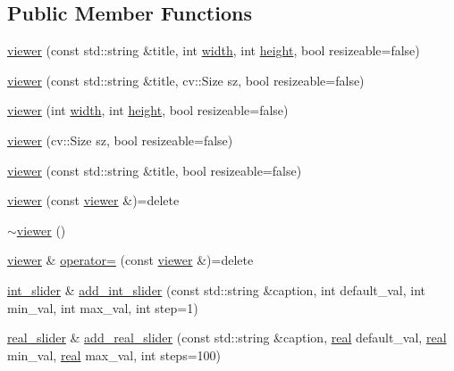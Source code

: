 \subsection*{Public Member Functions}
\begin{DoxyCompactItemize}
\item 
\hyperlink{classtlz_1_1viewer_ab840cedc6c257c4270c43d59705842cc}{viewer} (const std\+::string \&title, int \hyperlink{classtlz_1_1viewer_acc43bf1dd1d0c3cdc35a948d4c194769}{width}, int \hyperlink{classtlz_1_1viewer_af74a8aef9dde68eeff6b1e2561b39014}{height}, bool resizeable=false)
\item 
\hyperlink{classtlz_1_1viewer_a197747fd66bf0c2cb69ac598e08f6e79}{viewer} (const std\+::string \&title, cv\+::\+Size sz, bool resizeable=false)
\item 
\hyperlink{classtlz_1_1viewer_a3d7acc2df49af00c659dd55c6898344d}{viewer} (int \hyperlink{classtlz_1_1viewer_acc43bf1dd1d0c3cdc35a948d4c194769}{width}, int \hyperlink{classtlz_1_1viewer_af74a8aef9dde68eeff6b1e2561b39014}{height}, bool resizeable=false)
\item 
\hyperlink{classtlz_1_1viewer_a29d63e7cbf892927adc12c2c35c28c5d}{viewer} (cv\+::\+Size sz, bool resizeable=false)
\item 
\hyperlink{classtlz_1_1viewer_af946932c9c9ac062feaa9e15b55b79b8}{viewer} (const std\+::string \&title, bool resizeable=false)
\item 
\hyperlink{classtlz_1_1viewer_a916b709d0d5e9f08f0291c104b2edb0b}{viewer} (const \hyperlink{classtlz_1_1viewer}{viewer} \&)=delete
\item 
\hyperlink{classtlz_1_1viewer_a2db3e67ba1350a8be839d1725bd7ebc2}{$\sim$viewer} ()
\item 
\hyperlink{classtlz_1_1viewer}{viewer} \& \hyperlink{classtlz_1_1viewer_af41f88c9e47de049a1a7ff895c5fb5a1}{operator=} (const \hyperlink{classtlz_1_1viewer}{viewer} \&)=delete
\item 
\hyperlink{classtlz_1_1viewer_1_1int__slider}{int\+\_\+slider} \& \hyperlink{classtlz_1_1viewer_a2bf9d63d7a1a5ec4d5bdabc13d9ab688}{add\+\_\+int\+\_\+slider} (const std\+::string \&caption, int default\+\_\+val, int min\+\_\+val, int max\+\_\+val, int step=1)
\item 
\hyperlink{classtlz_1_1viewer_1_1real__slider}{real\+\_\+slider} \& \hyperlink{classtlz_1_1viewer_a4be73d43a59e54ac622a45ecb042e351}{add\+\_\+real\+\_\+slider} (const std\+::string \&caption, \hyperlink{namespacetlz_a15fd37cce97f2b8b606af18c2615f602}{real} default\+\_\+val, \hyperlink{namespacetlz_a15fd37cce97f2b8b606af18c2615f602}{real} min\+\_\+val, \hyperlink{namespacetlz_a15fd37cce97f2b8b606af18c2615f602}{real} max\+\_\+val, int steps=100)

\end{DoxyCompactItemize}
